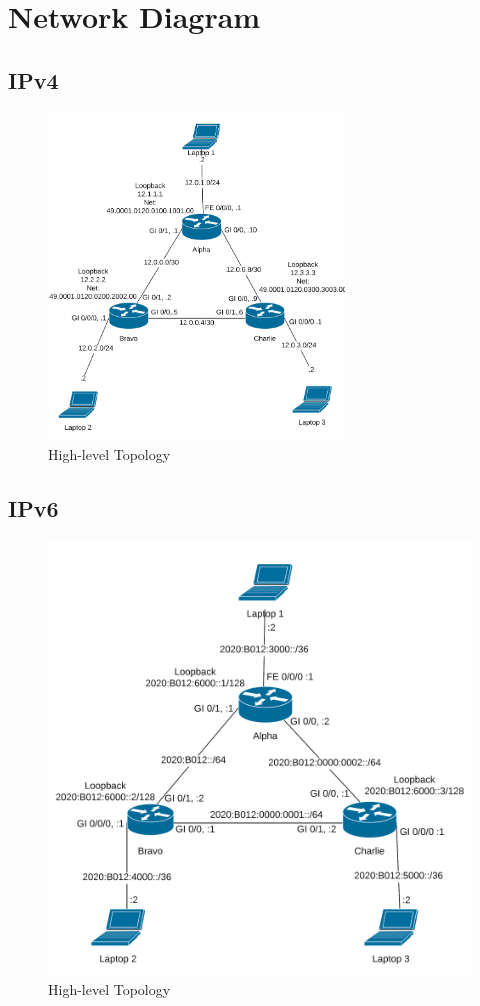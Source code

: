 \chapter{Network Diagram}
\section{IPv4}
\begin{figure}[!ht]
	\caption{High-level Topology}
	\centering
	\includegraphics[width=0.7\textwidth]{images/IPv4.png}
\end{figure}
\clearpage
\section{IPv6}
\begin{figure}[!ht]
	\caption{High-level Topology}
	\centering
	\includegraphics[width=\textwidth]{images/IPv6.png}
\end{figure}
\clearpage
